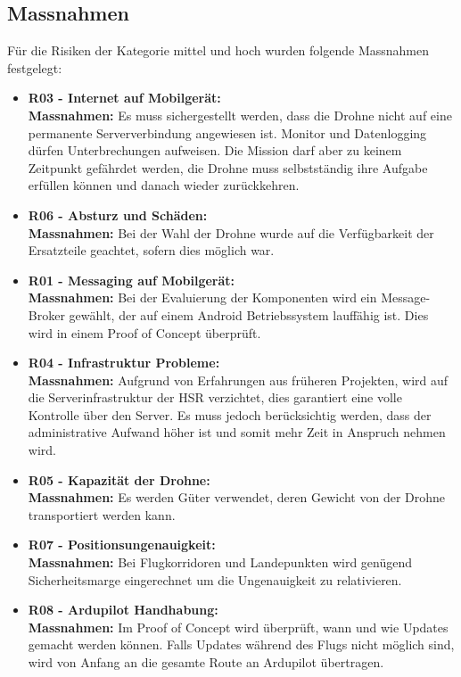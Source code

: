 \subsection{Massnahmen}
Für die Risiken der Kategorie mittel und hoch wurden folgende Massnahmen festgelegt:
\begin{itemize}
	\item{\textbf{R03 - Internet auf Mobilgerät:} \\
	\textbf{Massnahmen:} Es muss sichergestellt werden, dass die Drohne nicht auf eine permanente Serververbindung angewiesen ist. Monitor und Datenlogging dürfen Unterbrechungen aufweisen. Die Mission darf aber zu keinem Zeitpunkt gefährdet werden, die Drohne muss selbstständig ihre Aufgabe erfüllen können und danach wieder zurückkehren.}
	
	\item{\textbf{R06 - Absturz und Schäden:} \\
	\textbf{Massnahmen:} Bei der Wahl der Drohne wurde auf die Verfügbarkeit der Ersatzteile geachtet, sofern dies möglich war. }

	\item{\textbf{R01 - Messaging auf Mobilgerät:} \\
	\textbf{Massnahmen:} Bei der Evaluierung der Komponenten wird ein Message-Broker gewählt, der auf einem Android Betriebssystem lauffähig ist. Dies wird in einem Proof of Concept überprüft.}
	
	\item{\textbf{R04 - Infrastruktur Probleme:} \\
	\textbf{Massnahmen:} Aufgrund von Erfahrungen aus früheren Projekten, wird auf die Serverinfrastruktur der HSR verzichtet, dies garantiert eine volle Kontrolle über den Server. Es muss jedoch berücksichtig werden, dass der administrative Aufwand höher ist und somit mehr Zeit in Anspruch nehmen wird.}
	
	\item{\textbf{R05 - Kapazität der Drohne:} \\
	\textbf{Massnahmen:} Es werden Güter verwendet, deren Gewicht von der Drohne transportiert werden kann.}	
	
	\item{\textbf{R07 - Positionsungenauigkeit:} \\
	\textbf{Massnahmen:} Bei Flugkorridoren und Landepunkten wird genügend Sicherheitsmarge eingerechnet um die Ungenauigkeit zu relativieren.}
	
	\item{\textbf{R08 - Ardupilot Handhabung:} \\
	\textbf{Massnahmen:}  Im Proof of Concept wird überprüft, wann und wie Updates gemacht werden können. Falls Updates während des Flugs nicht möglich sind, wird von Anfang an die gesamte Route an Ardupilot übertragen.}
	

\end{itemize}
